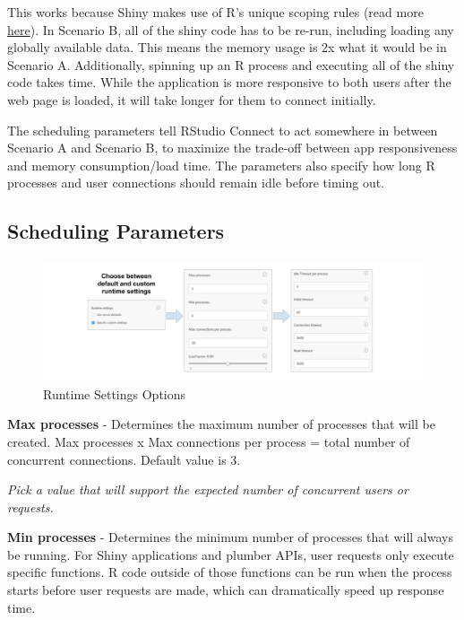 \documentclass[]{book}
\theoremstyle{definition}
\theoremstyle{definition}
\theoremstyle{definition}
\theoremstyle{remark}
\begin{document}
This works because Shiny makes use of R's unique scoping rules (read
more \href{http://shiny.rstudio.com/articles/scoping.html}{here}). In
Scenario B, all of the shiny code has to be re-run, including loading
any globally available data. This means the memory usage is 2x what it
would be in Scenario A. Additionally, spinning up an R process and
executing all of the shiny code takes time. While the application is
more responsive to both users after the web page is loaded, it will take
longer for them to connect initially.

The scheduling parameters tell RStudio Connect to act somewhere in
between Scenario A and Scenario B, to maximize the trade-off between app
responsiveness and memory consumption/load time. The parameters also
specify how long R processes and user connections should remain idle
before timing out.

\hypertarget{scheduling-parameters}{%
\subsection{Scheduling Parameters}\label{scheduling-parameters}}

\begin{figure}
\centering
\includegraphics{imgs/scaling/rsc-runtime.png}
\caption{Runtime Settings Options}
\end{figure}

\textbf{Max processes} - Determines the maximum number of processes that
will be created. Max processes x Max connections per process = total
number of concurrent connections. Default value is 3.

\emph{Pick a value that will support the expected number of concurrent
users or requests.}

\textbf{Min processes} - Determines the minimum number of processes that
will always be running. For Shiny applications and plumber APIs, user
requests only execute specific functions. R code outside of those
functions can be run when the process starts before user requests are
made, which can dramatically speed up response time.
\end{document}
